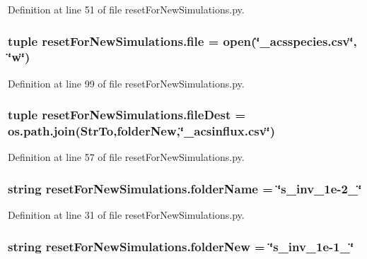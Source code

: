 Definition at line 51 of file reset\-For\-New\-Simulations.\-py.

\hypertarget{namespacereset_for_new_simulations_a3caa9a656a250a12f7112582bde03381}{
\subsubsection[{file}]{\setlength{\rightskip}{0pt plus 5cm}tuple reset\-For\-New\-Simulations.\-file = open(\char`\"{}\-\_\-acsspecies.\-csv\char`\"{}, \char`\"{}w\char`\"{})}}\label{namespacereset_for_new_simulations_a3caa9a656a250a12f7112582bde03381}


Definition at line 99 of file reset\-For\-New\-Simulations.\-py.

\hypertarget{namespacereset_for_new_simulations_a0fd24d58ef8ebf1029176f620ce7fe65}{
\subsubsection[{file\-Dest}]{\setlength{\rightskip}{0pt plus 5cm}tuple reset\-For\-New\-Simulations.\-file\-Dest = os.\-path.\-join(Str\-To,{\bf folder\-New},\char`\"{}\-\_\-acsinflux.\-csv\char`\"{})}}\label{namespacereset_for_new_simulations_a0fd24d58ef8ebf1029176f620ce7fe65}


Definition at line 57 of file reset\-For\-New\-Simulations.\-py.

\hypertarget{namespacereset_for_new_simulations_af9fbda1c8e6d13404f0224a5b3ef16fe}{
\subsubsection[{folder\-Name}]{\setlength{\rightskip}{0pt plus 5cm}string reset\-For\-New\-Simulations.\-folder\-Name = \char`\"{}s\-\_\-inv\-\_\-1e-\/2\-\_\-\char`\"{}}}\label{namespacereset_for_new_simulations_af9fbda1c8e6d13404f0224a5b3ef16fe}


Definition at line 31 of file reset\-For\-New\-Simulations.\-py.

\hypertarget{namespacereset_for_new_simulations_adfad2b3e8459d644a442c254865c564b}{
\subsubsection[{folder\-New}]{\setlength{\rightskip}{0pt plus 5cm}string reset\-For\-New\-Simulations.\-folder\-New = \char`\"{}s\-\_\-inv\-\_\-1e-\/1\-\_\-\char`\"{}}}\label{namespacereset_for_new_simulations_adfad2b3e8459d644a442c254865c564b}


